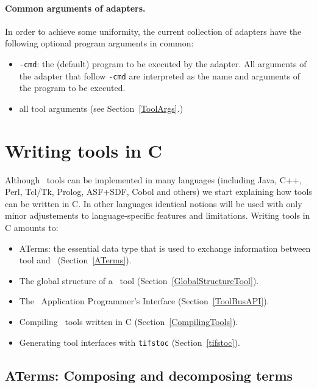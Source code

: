 \documentclass[twoside]{article} %
\begin{document}
\paragraph{Common arguments of adapters.} In order to achieve some uniformity,
the current collection of adapters have the following optional program arguments
in common:

\begin{itemize}

\item {\tt -cmd}: the (default) program to be executed by the adapter.
All arguments of the adapter that follow {\tt -cmd} are interpreted as
the name and arguments of the program to be executed.

\item all tool arguments (see Section~\ref{ToolArgs}.)
\end{itemize}


\section{\label{ToolsInC}Writing tools in C}

Although \TB\ tools can be implemented in many languages (including Java, C++,
Perl, Tcl/Tk, Prolog, ASF+SDF, Cobol and others) we start explaining how tools
can be written in C. In other languages identical notions will be used with
only minor adjustements to language-specific features and limitations.
Writing tools in C amounts to:

\begin{itemize}

\item ATerms: the essential data type that is used to exchange
information between tool and \TB\ (Section~\ref{ATerms}).

\item The global structure of a \TB\ tool (Section~\ref{GlobalStructureTool}).

\item The \TB\ Application Programmer's Interface  (Section~\ref{ToolBusAPI}).

\item Compiling \TB\ tools written in C (Section~\ref{CompilingTools}).
  
\item Generating tool interfaces with {\tt tifstoc} (Section~\ref{tifstoc}).

\end{itemize}

\subsection{\label{ATerms}ATerms: Composing and decomposing terms}
\end{document}
